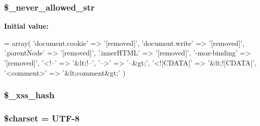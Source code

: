 \subsubsection[{\$\+\_\+never\+\_\+allowed\+\_\+str}]{\setlength{\rightskip}{0pt plus 5cm}\$\+\_\+never\+\_\+allowed\+\_\+str\hspace{0.3cm}{\ttfamily [protected]}}\label{class_c_i___security_ab883fab930a1c4a926eaa501ab211823}
{\bfseries Initial value\+:}
\begin{DoxyCode}
=   array(
        \textcolor{stringliteral}{'document.cookie'}   => \textcolor{stringliteral}{'[removed]'},
        \textcolor{stringliteral}{'document.write'}    => \textcolor{stringliteral}{'[removed]'},
        \textcolor{stringliteral}{'.parentNode'}       => \textcolor{stringliteral}{'[removed]'},
        \textcolor{stringliteral}{'.innerHTML'}        => \textcolor{stringliteral}{'[removed]'},
        \textcolor{stringliteral}{'-moz-binding'}      => \textcolor{stringliteral}{'[removed]'},
        \textcolor{stringliteral}{'<!--'}              => \textcolor{stringliteral}{'&lt;!--'},
        \textcolor{stringliteral}{'-->'}               => \textcolor{stringliteral}{'--&gt;'},
        \textcolor{stringliteral}{'<![CDATA['}         => \textcolor{stringliteral}{'&lt;![CDATA['},
        \textcolor{stringliteral}{'<comment>'}         => \textcolor{stringliteral}{'&lt;comment&gt;'}
    )
\end{DoxyCode}
\hypertarget{class_c_i___security_aca426a0e87199bfa36c7401a1d06a419}{}
\subsubsection[{\$\+\_\+xss\+\_\+hash}]{\setlength{\rightskip}{0pt plus 5cm}\$\+\_\+xss\+\_\+hash\hspace{0.3cm}{\ttfamily [protected]}}\label{class_c_i___security_aca426a0e87199bfa36c7401a1d06a419}
\hypertarget{class_c_i___security_af10158dd74b75f1d337e83102d6b82ce}{}
\subsubsection[{\$charset}]{\setlength{\rightskip}{0pt plus 5cm}\$charset = \textquotesingle{}U\+T\+F-\/8\textquotesingle{}}\label{class_c_i___security_af10158dd74b75f1d337e83102d6b82ce}
\hypertarget{class_c_i___security_a7ea55abf18a7d5ed32df02a8144b72e2}{}
